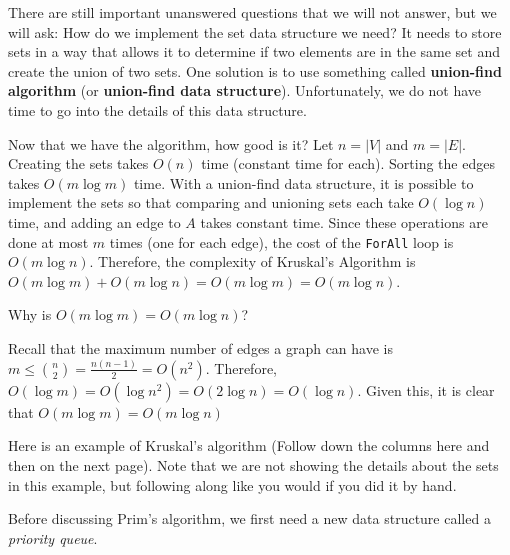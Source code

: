 There are still important unanswered questions that we will not answer, 
but we will ask: How do we implement the set data structure we need? 
It needs to store sets in a way that allows it to determine if
two elements are in the same set and create the union of two sets.
One solution is to use something called {\bf union-find algorithm}
(or {\bf union-find data structure}).
Unfortunately, we do not have time to go into the details of this
data structure.

Now that we have the algorithm, how good is it?
Let $n=|V|$ and $m=|E|$.
Creating the sets takes $O(n)$ time (constant time for each).
Sorting the edges takes $O(m\log m)$ time.
With a union-find data structure, 
it is possible to implement the sets so that 
comparing and unioning sets each take $O(\log n)$ time,
and adding an edge to $A$ takes constant time.
Since these operations are done at most $m$ times
(one for each edge), the cost of the \verb+ForAll+ loop
is $O(m\log n)$.
Therefore, the complexity of Kruskal's Algorithm is 
$O(m\log m)+O(m\log n)=O(m\log m)=O(m\log n)$.

\begin{ques}
Why is $O(m\log m)=O(m\log n)$?
\vspace*{1in}
\begin{answer}
Recall that the maximum number of edges a graph can have is 
$m\leq \binom{n}{2}=\frac{n(n-1)}{2}=O(n^2)$.
Therefore, $O(\log m)=O( \log n^2)=O(2\log n)=O(\log n)$.
Given this, it is clear that $O(m\log m)=O(m\log n)$
\end{answer}
\end{ques}


\begin{exa}
Here is an example of Kruskal's algorithm
(Follow down the columns here and then on the next page).
Note that we are not showing the details about the sets in this 
example, but following along like you would if you did it by hand.\\

\noindent
{} \hfill
{} 

\noindent
{} \hfill 
{}
\end{exa}

Before discussing Prim's algorithm, we first need a new data structure
called a {\em priority queue}.

